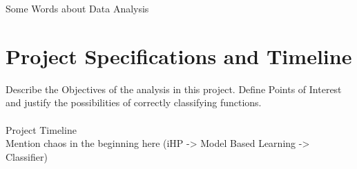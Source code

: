 \documentclass[main.tex]{subfiles}
\begin{document}
  
  Some Words about Data Analysis
  
  \section{Project Specifications and Timeline}
    Describe the Objectives of the analysis in this project. Define Points of Interest and justify the possibilities of correctly classifying functions.
    \\\\
    Project Timeline \\
    Mention chaos in the beginning here (iHP -> Model Based Learning -> Classifier)
    
\end{document}
